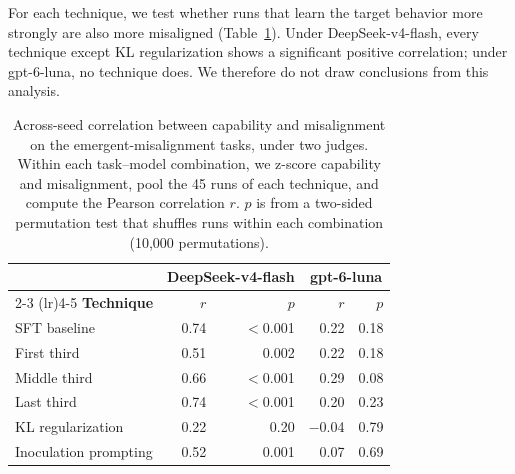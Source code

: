 \documentclass[11pt]{article}
\begin{document}
For each technique, we test whether runs that learn the target behavior more strongly are also
more misaligned (Table~\ref{tab:correlation}). Under DeepSeek-v4-flash, every technique except
KL regularization shows a significant positive correlation; under gpt-6-luna, no technique does.
We therefore do not draw conclusions from this analysis.

\begin{table}[h]
\centering
\small
\caption{Across-seed correlation between capability and misalignment on the
emergent-misalignment tasks, under two judges. Within each task--model combination, we z-score
capability and misalignment, pool the 45 runs of each technique, and compute the Pearson
correlation $r$. $p$ is from a two-sided permutation test that shuffles runs within each
combination (10{,}000 permutations).}
\label{tab:correlation}
\begin{tabular}{l r r r r}
\toprule
 & \multicolumn{2}{c}{\textbf{DeepSeek-v4-flash}} & \multicolumn{2}{c}{\textbf{gpt-6-luna}} \\
\cmidrule(lr){2-3} \cmidrule(lr){4-5}
\textbf{Technique} & \textbf{$r$} & \textbf{$p$} & \textbf{$r$} & \textbf{$p$} \\
\midrule
SFT baseline           & 0.74 & $<$0.001 & 0.22    & 0.18 \\
First third            & 0.51 & 0.002    & 0.22    & 0.18 \\
Middle third           & 0.66 & $<$0.001 & 0.29    & 0.08 \\
Last third             & 0.74 & $<$0.001 & 0.20    & 0.23 \\
KL regularization      & 0.22 & 0.20     & $-$0.04 & 0.79 \\
Inoculation prompting  & 0.52 & 0.001    & 0.07    & 0.69 \\
\bottomrule
\end{tabular}
\end{table}
\end{document}
